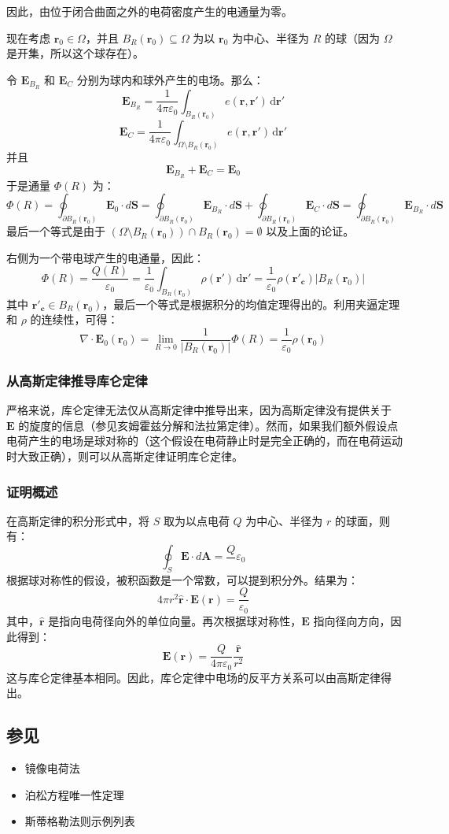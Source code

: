 因此，由位于闭合曲面之外的电荷密度产生的电通量为零。

现在考虑 \( \mathbf{r}_0 \in \Omega \)，并且 \( B_R(\mathbf{r}_0) \subseteq \Omega \) 为以 \( \mathbf{r}_0 \) 为中心、半径为 \( R \) 的球（因为 \(\Omega\) 是开集，所以这个球存在）。

令 \( \mathbf{E}_{B_R} \) 和 \( \mathbf{E}_C \) 分别为球内和球外产生的电场。那么：
\[
\mathbf{E}_{B_R} = \frac{1}{4 \pi \varepsilon_0} \int_{B_R(\mathbf{r}_0)} e(\mathbf{r}, \mathbf{r'}) \, \mathrm{d} \mathbf{r'}~
\]
\[
\mathbf{E}_C = \frac{1}{4 \pi \varepsilon_0} \int_{\Omega \setminus B_R(\mathbf{r}_0)} e(\mathbf{r}, \mathbf{r'}) \, \mathrm{d} \mathbf{r'}~
\]
并且
\[
\mathbf{E}_{B_R} + \mathbf{E}_C = \mathbf{E}_0~
\]
于是通量 \( \Phi(R) \) 为：
\[
\Phi(R) = \oint_{\partial B_R(\mathbf{r}_0)} \mathbf{E}_0 \cdot d\mathbf{S} = \oint_{\partial B_R(\mathbf{r}_0)} \mathbf{E}_{B_R} \cdot d\mathbf{S} + \oint_{\partial B_R(\mathbf{r}_0)} \mathbf{E}_C \cdot d\mathbf{S} = \oint_{\partial B_R(\mathbf{r}_0)} \mathbf{E}_{B_R} \cdot d\mathbf{S}~
\]
最后一个等式是由于 \((\Omega \setminus B_R(\mathbf{r}_0)) \cap B_R(\mathbf{r}_0) = \emptyset\) 以及上面的论证。

右侧为一个带电球产生的电通量，因此：
\[
\Phi(R) = \frac{Q(R)}{\varepsilon_0} = \frac{1}{\varepsilon_0} \int_{B_R(\mathbf{r}_0)} \rho(\mathbf{r'}) \, \mathrm{d} \mathbf{r'} = \frac{1}{\varepsilon_0} \rho(\mathbf{r'_c}) |B_R(\mathbf{r}_0)|~
\]
其中 \( \mathbf{r'_c} \in B_R(\mathbf{r}_0) \)，最后一个等式是根据积分的均值定理得出的。利用夹逼定理和 \(\rho\) 的连续性，可得：
\[
\nabla \cdot \mathbf{E}_0(\mathbf{r}_0) = \lim_{R \to 0} \frac{1}{|B_R(\mathbf{r}_0)|} \Phi(R) = \frac{1}{\varepsilon_0} \rho(\mathbf{r}_0)~
\]
\subsubsection{从高斯定律推导库仑定律}
严格来说，库仑定律无法仅从高斯定律中推导出来，因为高斯定律没有提供关于 \(\mathbf{E}\) 的旋度的信息（参见亥姆霍兹分解和法拉第定律）。然而，如果我们额外假设点电荷产生的电场是球对称的（这个假设在电荷静止时是完全正确的，而在电荷运动时大致正确），则可以从高斯定律证明库仑定律。

\subsubsection{证明概述}
在高斯定律的积分形式中，将 \( S \) 取为以点电荷 \( Q \) 为中心、半径为 \( r \) 的球面，则有：
\[
\oint_{S} \mathbf{E} \cdot d\mathbf{A} = \frac{Q}~{\varepsilon_0}~
\]
根据球对称性的假设，被积函数是一个常数，可以提到积分外。结果为：
\[
4 \pi r^2 \hat{\mathbf{r}} \cdot \mathbf{E}(\mathbf{r}) = \frac{Q}{\varepsilon_0}~
\]
其中，\(\hat{\mathbf{r}}\) 是指向电荷径向外的单位向量。再次根据球对称性，\(\mathbf{E}\) 指向径向方向，因此得到：
\[
\mathbf{E}(\mathbf{r}) = \frac{Q}{4 \pi \varepsilon_0} \frac{\hat{\mathbf{r}}}{r^2}~
\]
这与库仑定律基本相同。因此，库仑定律中电场的反平方关系可以由高斯定律得出。
\subsection{参见}
\begin{itemize}
\item 镜像电荷法
\item 泊松方程唯一性定理
\item 斯蒂格勒法则示例列表
\end{itemize}